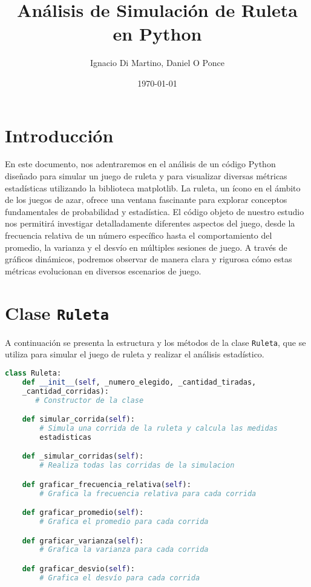 \documentclass{article}
\begin{document}
\title{Análisis de Simulación de Ruleta en Python}
\author{Ignacio Di Martino, Daniel O Ponce }
\date{\today}

\maketitle

\section{Introducción}

En este documento, nos adentraremos en el análisis de un código Python diseñado para simular un juego de ruleta y para visualizar diversas métricas estadísticas utilizando la biblioteca matplotlib. La ruleta, un ícono en el ámbito de los juegos de azar, ofrece una ventana fascinante para explorar conceptos fundamentales de probabilidad y estadística. El código objeto de nuestro estudio nos permitirá investigar detalladamente diferentes aspectos del juego, desde la frecuencia relativa de un número específico hasta el comportamiento del promedio, la varianza y el desvío en múltiples sesiones de juego. A través de gráficos dinámicos, podremos observar de manera clara y rigurosa cómo estas métricas evolucionan en diversos escenarios de juego.

\section{Clase \texttt{Ruleta}}

A continuación se presenta la estructura y los métodos de la clase \texttt{Ruleta}, que se utiliza para simular el juego de ruleta y realizar el análisis estadístico.

\begin{lstlisting}[language=Python,caption={Estructura y métodos de la clase Ruleta}]
class Ruleta:
    def __init__(self, _numero_elegido, _cantidad_tiradas,
    _cantidad_corridas):
       # Constructor de la clase

    def simular_corrida(self):
        # Simula una corrida de la ruleta y calcula las medidas
        estadisticas

    def _simular_corridas(self):
        # Realiza todas las corridas de la simulacion

    def graficar_frecuencia_relativa(self):
        # Grafica la frecuencia relativa para cada corrida

    def graficar_promedio(self):
        # Grafica el promedio para cada corrida

    def graficar_varianza(self):
        # Grafica la varianza para cada corrida

    def graficar_desvio(self):
        # Grafica el desvío para cada corrida
\end{lstlisting}
\end{document}
